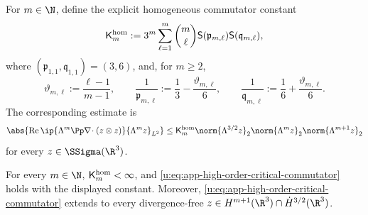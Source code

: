 For \(m\in\N\), define the explicit homogeneous commutator constant
\begin{equation}
 \mathsf K_m^{\rm hom}:=
 3^m\sum_{\ell=1}^m\binom m\ell
 \mathsf S(\mathfrak p_{m,\ell})\mathsf S(\mathfrak q_{m,\ell}),
 \label{u:eq:app-explicit-homogeneous-commutator-constant}
\end{equation}
where \((\mathfrak p_{1,1},\mathfrak q_{1,1})=(3,6)\), and, for \(m\ge2\),
\[
 \vartheta_{m,\ell}:=\frac{\ell-1}{m-1},
 \qquad
 \frac1{\mathfrak p_{m,\ell}}:=\frac13-\frac{\vartheta_{m,\ell}}6,
 \qquad
 \frac1{\mathfrak q_{m,\ell}}:=\frac16+\frac{\vartheta_{m,\ell}}6.
\]
The corresponding estimate is
\begin{equation}
 \abs{\operatorname{Re}
 \ip{\Lambda^m\Pp\nabla\!\cdot(z\otimes z)}
     {\Lambda^mz}_{L^2}}
 \le
 \mathsf K_m^{\rm hom}
 \norm{\Lambda^{3/2}z}_2
 \norm{\Lambda^mz}_2
 \norm{\Lambda^{m+1}z}_2
 \label{u:eq:app-high-order-critical-commutator}
\end{equation}
for every \(z\in\SSigma(\R^3)\).

\begin{lemma}
\label{u:lem:app-critical-commutator}
For every \(m\in\N\), \(\mathsf K_m^{\rm hom}<\infty\), and
\eqref{u:eq:app-high-order-critical-commutator} holds with the displayed
constant.
Moreover, \eqref{u:eq:app-high-order-critical-commutator} extends to every
divergence-free
\(z\in H^{m+1}(\R^3)\cap\dot H^{3/2}(\R^3)\).
\end{lemma}

